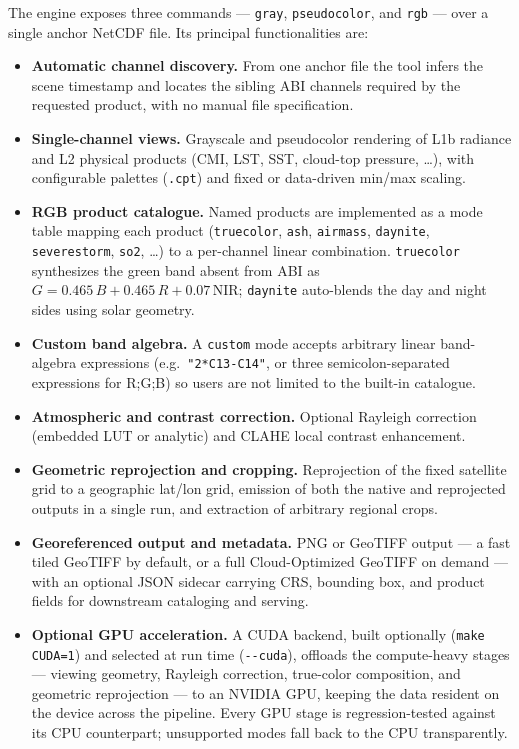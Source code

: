 \documentclass[preprint,12pt]{elsarticle}
\begin{document}
The engine exposes three commands --- \texttt{gray}, \texttt{pseudocolor}, and
\texttt{rgb} --- over a single anchor NetCDF file. Its principal
functionalities are:

\begin{itemize}
    \item \textbf{Automatic channel discovery.} From one anchor file the tool
    infers the scene timestamp and locates the sibling ABI channels required by
    the requested product, with no manual file specification.
    \item \textbf{Single-channel views.} Grayscale and pseudocolor rendering of
    L1b radiance and L2 physical products (CMI, LST, SST, cloud-top pressure,
    \ldots), with configurable palettes (\texttt{.cpt}) and fixed or
    data-driven min/max scaling.
    \item \textbf{RGB product catalogue.} Named products are implemented as a
    mode table mapping each product (\texttt{truecolor}, \texttt{ash},
    \texttt{airmass}, \texttt{daynite}, \texttt{severestorm}, \texttt{so2},
    \ldots) to a per-channel linear combination. \texttt{truecolor} synthesizes
    the green band absent from ABI as
    $G = 0.465\,B + 0.465\,R + 0.07\,\mathrm{NIR}$; \texttt{daynite} auto-blends
    the day and night sides using solar geometry.
    \item \textbf{Custom band algebra.} A \texttt{custom} mode accepts arbitrary
    linear band-algebra expressions (e.g.\ \texttt{"2*C13-C14"}, or three
    semicolon-separated expressions for R;G;B) so users are not limited to the
    built-in catalogue.
    \item \textbf{Atmospheric and contrast correction.} Optional Rayleigh
    correction (embedded LUT or analytic) and CLAHE local contrast enhancement.
    \item \textbf{Geometric reprojection and cropping.} Reprojection of the
    fixed satellite grid to a geographic lat/lon grid, emission of both the
    native and reprojected outputs in a single run, and extraction of arbitrary
    regional crops.
    \item \textbf{Georeferenced output and metadata.} PNG or GeoTIFF output ---
    a fast tiled GeoTIFF by default, or a full Cloud-Optimized GeoTIFF on
    demand --- with an optional JSON sidecar carrying CRS, bounding box, and
    product fields for downstream cataloging and serving.
    \item \textbf{Optional GPU acceleration.} A CUDA backend, built optionally
    (\texttt{make CUDA=1}) and selected at run time (\texttt{-{}-cuda}),
    offloads the compute-heavy stages --- viewing geometry, Rayleigh correction,
    true-color composition, and geometric reprojection --- to an NVIDIA GPU,
    keeping the data resident on the device across the pipeline. Every GPU stage
    is regression-tested against its CPU counterpart; unsupported modes fall back
    to the CPU transparently.
\end{itemize}
\end{document}
